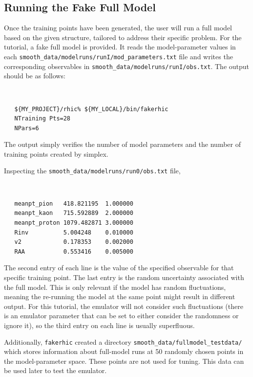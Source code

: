 \documentclass[UserManual.tex]{subfiles}
\begin{document}
\subsection{Running the Fake Full Model}
Once the training points have been generated, the user will run a full model based on the given structure, tailored to address their specific problem. For the tutorial, a fake full model is provided. It reads the model-parameter values in each {\tt smooth\_data/modelruns/runI/mod\_parameters.txt} file and writes the corresponding observables in {\tt smooth\_data/modelruns/runI/obs.txt}. The output should be as follows:
{\tt
\begin{verbatim}
   ${MY_PROJECT}/rhic% ${MY_LOCAL}/bin/fakerhic
   NTraining Pts=28
   NPars=6
\end{verbatim}
}
The output simply verifies the number of model parameters and the number of training points created by simplex.

Inspecting the {\tt smooth\_data/modelruns/run0/obs.txt} file,
{\tt
\begin{verbatim}
   meanpt_pion   418.821195  1.000000
   meanpt_kaon   715.592889  2.000000
   meanpt_proton 1079.482871 3.000000
   Rinv          5.004248    0.010000
   v2            0.178353    0.002000
   RAA           0.553416    0.005000
\end{verbatim}
}
The second entry of each line is the value of the specified observable for that specific training point. The last entry is the random uncertainty associated with the full model. This is only relevant if the model has random fluctuations, meaning the re-running the model at the same point might result in different output. For this tutorial, the emulator will not consider such fluctuations (there is an emulator parameter that can be set to either consider the randomness or ignore it), so the third entry on each line is usually superfluous. 

Additionally, {\tt fakerhic} created a directory {\tt smooth\_data/fullmodel\_testdata/} which stores information about full-model runs at 50 randomly chosen points in the model-parameter space. These points are not used for tuning. This data can be used later to test the emulator. 
\end{document}
